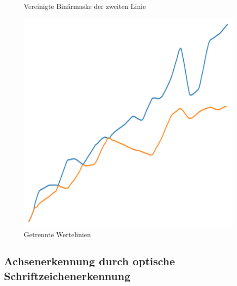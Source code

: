 \begin{figure}[H]
\begin{minipage}{0.315\textwidth}
        \caption{ Vereinigte Binärmaske der zweiten Linie}
        \label{fig:alg_layer2_processed}
    \end{minipage}\hfill %
    \begin{minipage}{0.315\textwidth} %
        \centering
        \includegraphics[width=\linewidth]{Implementation/img/alg_mat.png}
        \caption{ Getrennte Wertelinien}
        \label{fig:alg_mat}
    \end{minipage}
\end{figure}

\subsection{Achsenerkennung durch optische Schriftzeichenerkennung}

